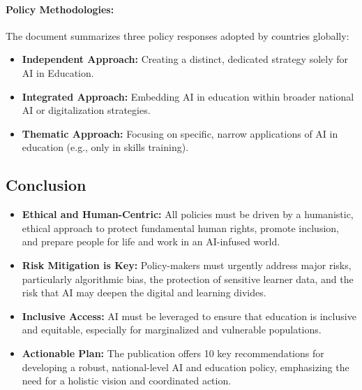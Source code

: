 \documentclass[12pt,a4paper]{report}
\begin{document}
\paragraph{Policy Methodologies:}
The document summarizes three policy responses adopted by countries globally:
\begin{itemize}
  \item \textbf{Independent Approach:} Creating a distinct, dedicated strategy solely for AI in Education.
  \item \textbf{Integrated Approach:} Embedding AI in education within broader national AI or digitalization strategies.
  \item \textbf{Thematic Approach:} Focusing on specific, narrow applications of AI in education (e.g., only in skills training).
\end{itemize}

\subsection{Conclusion}
\begin{itemize}
  \item \textbf{Ethical and Human-Centric:} All policies must be driven by a humanistic, ethical approach to protect fundamental human rights, promote inclusion, and prepare people for life and work in an AI-infused world.
  \item \textbf{Risk Mitigation is Key:} Policy-makers must urgently address major risks, particularly algorithmic bias, the protection of sensitive learner data, and the risk that AI may deepen the digital and learning divides.
  \item \textbf{Inclusive Access:} AI must be leveraged to ensure that education is inclusive and equitable, especially for marginalized and vulnerable populations.
  \item \textbf{Actionable Plan:} The publication offers 10 key recommendations for developing a robust, national-level AI and education policy, emphasizing the need for a holistic vision and coordinated action.
\end{itemize}
\end{document}

